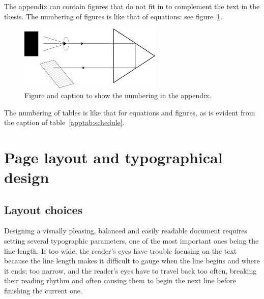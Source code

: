 \documentclass[english, 12pt, a4paper, elec, utf8, a-2b, online]{aaltothesis}
\begin{document}
The appendix can contain figures that do not fit in to complement the text in 
the thesis. The numbering of figures is like that of equations: see figure~\ref{appfig:refraction}.

\begin{figure}[b]
	\centering
		\includegraphics[height=31mm]{./linediagram.pdf}
	\caption{Figure and caption to show the numbering in the appendix.}
	\label{appfig:refraction}
\end{figure}

The numbering of tables is like that for equations and figures, as is evident 
from the caption of table~\ref{apptab:schedule}.

\begin{table}[htb]
	\centering
	\caption{Caption for the table.}
	\label{apptab:schedule}
	\sffamily%
\end{table}


\clearpage
\section{Page layout and typographical design}
\label{app:layout}

\subsection*{Layout choices}

Designing a visually pleasing, balanced and easily readable document requires 
setting several typographic parameters, one of the most important ones being the
line length. If too wide, the reader’s eyes have trouble focusing on the text 
because the line length makes it difficult to gauge when the line begins and 
where it ends; too narrow, and the reader’s eyes have to travel back too often, 
breaking their reading rhythm and often causing them to begin the next line 
before finishing the current one.
\end{document}
